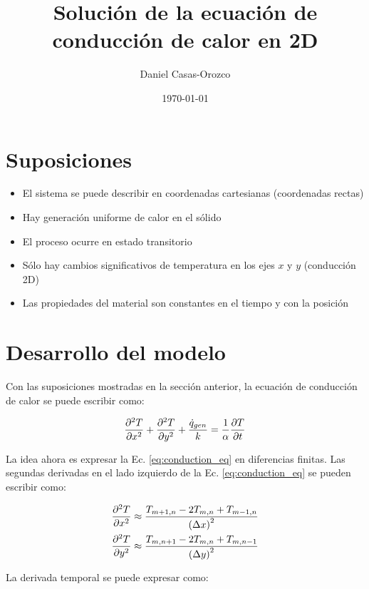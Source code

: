 \documentclass[11pt]{article}
\title{Solución de la ecuación de conducción de calor en 2D}
\author{Daniel Casas-Orozco}
\date{\today}
\begin{document}
\maketitle

\section{Suposiciones}

\begin{itemize}
	\item El sistema se puede describir en coordenadas cartesianas (coordenadas rectas)
	\item Hay generación uniforme de calor en el sólido
	\item El proceso ocurre en estado transitorio
	\item Sólo hay cambios significativos de temperatura en los ejes $x$ y $y$ (conducción 2D)
	\item Las propiedades del material son constantes en el tiempo y con la posición
\end{itemize}

\section{Desarrollo del modelo}

Con las suposiciones mostradas en la sección anterior, la ecuación de conducción de calor se puede escribir como:

\begin{equation} \label{eq:conduction_eq}
	\pdv[2]{T}{x} + \pdv[2]{T}{y} + \frac{\dot{q}_{gen}}{k} = \frac{1}{\alpha} \pdv{T}{t}
\end{equation}

La idea ahora es expresar la Ec. \eqref{eq:conduction_eq} en diferencias finitas. Las segundas derivadas en el lado izquierdo de la Ec. \eqref{eq:conduction_eq} se pueden escribir como:

\begin{equation} \label{eq:second_deriv}
	\begin{aligned}
		\pdv[2]{T}{x} & \approx \frac{T_{m + 1, n} - 2 T_{m, n} + T_{m - 1, n}}{\left(\Delta x \right)^2} \\
		\pdv[2]{T}{y} & \approx \frac{T_{m, n + 1} - 2 T_{m, n} + T_{m, n - 1}}{\left(\Delta y \right)^2}
	\end{aligned}
\end{equation}

La derivada temporal se puede expresar como:
\end{document}
